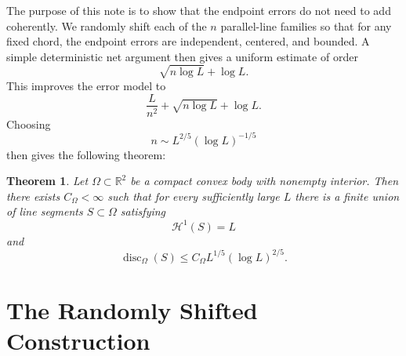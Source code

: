 \documentclass[11pt]{article}
\newtheorem{theorem}{Theorem}
\newcommand{\R}{\mathbb R}
\newcommand{\cH}{\mathcal H}
\begin{document}
\bigskip
\noindent
The purpose of this note is to show that the endpoint errors do not need to add coherently. We randomly shift each of the $n$ parallel-line families so that for any fixed chord, the endpoint errors are independent, centered, and bounded. A simple deterministic net argument then gives a uniform estimate of order
\[
        \sqrt{n\log L}+\log L.
\]
This improves the error model to
\[
        \frac{L}{n^2}+\sqrt{n\log L}+\log L.
\]
Choosing
\[
        n\sim L^{2/5}(\log L)^{-1/5}
\]
then gives the following theorem:

\begin{theorem}\label{thm:main}
Let $\Omega\subset\R^2$ be a compact convex body with nonempty interior. Then there exists $C_\Omega<\infty$ such that for every sufficiently large $L$ there is a finite union of line segments $S\subset\Omega$ satisfying
\[
        \cH^1(S)=L
\]
and
\[
        \operatorname{disc}_\Omega(S)
        \le
        C_\Omega L^{1/5}(\log L)^{2/5}.
\]
\end{theorem}

\section{The Randomly Shifted Construction}
\end{document}
